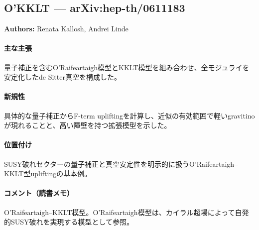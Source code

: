 \subsection{O'KKLT --- arXiv:hep-th/0611183}

\textbf{Authors:} Renata Kallosh, Andrei Linde

\paragraph{主な主張}
量子補正を含むO'Raifeartaigh模型とKKLT模型を組み合わせ、全モジュライを安定化したde Sitter真空を構成した\cite{Kallosh:2006dv}。

\paragraph{新規性}
具体的な量子補正からF-term upliftingを計算し、近似の有効範囲で軽いgravitinoが現れることと、高い障壁を持つ拡張模型を示した。

\paragraph{位置付け}
SUSY破れセクターの量子補正と真空安定性を明示的に扱うO'Raifeartaigh--KKLT型upliftingの基本例。

\paragraph{コメント（読書メモ）}
O'Raifeartaigh--KKLT模型。O'Raifeartaigh模型は、カイラル超場によって自発的SUSY破れを実現する模型として参照。
